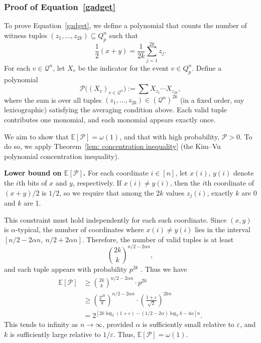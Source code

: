 \documentclass[11pt]{article}
\theoremstyle{definition}
\theoremstyle{plain}
\begin{document}
\subsubsection*{Proof of Equation~\eqref{gadget}}

To prove Equation~\eqref{gadget}, we define a polynomial that counts the number of witness tuples \( (z_1, \ldots, z_{2k}) \subseteq Q_p^n \) such that
\[
\frac{1}{2}(x + y) = \frac{1}{2k} \sum_{j=1}^{2k} z_j.
\]
For each \( v \in \mathcal{Q}^n \), let \( X_v \) be the indicator for the event \( v \in Q_p^n \). Define a polynomial
\[
\mathcal{P}\big((X_v)_{v \in \mathcal{Q}^n}\big) := \sum X_{z_1} \cdots X_{z_{2k}},
\]
where the sum is over all tuples \( (z_1, \ldots, z_{2k}) \in (\mathcal{Q}^n)^{2k} \) (in a fixed order, say lexicographic) satisfying the averaging condition above. Each valid tuple contributes one monomial, and each monomial appears exactly once.

We aim to show that \( \mathbb{E}[\mathcal{P}] = \omega(1) \), and that with high probability, \( \mathcal{P}>0 \). To do so, we apply Theorem~\ref{lem: concentration inequality} (the Kim–Vu polynomial concentration inequality).

\vspace{.1 in}


{\bf Lower bound on \( \mathbb{E}[\mathcal{P}] \).}
For each coordinate \( i \in [n] \), let \( x(i) \), \( y(i) \) denote the \( i \)th bits of \( x \) and \( y \), respectively. If \( x(i) \neq y(i) \), then the \( i \)th coordinate of \( (x + y)/2 \) is \( 1/2 \), so we require that among the \( 2k \) values \( z_j(i) \), exactly \( k \) are 0 and \( k \) are 1.

This constraint must hold independently for each such coordinate. Since \( (x, y) \) is \( \alpha \)-typical, the number of coordinates where \( x(i) \neq y(i) \) lies in the interval \( \left[ n/2 - 2\alpha n,\ n/2 + 2\alpha n \right] \). Therefore, the number of valid tuples is at least
\[
\binom{2k}{k}^{n/2 - 2\alpha n},
\]
and each tuple appears with probability \( p^{2k} \) . Thus we have
\begin{align*}
\mathbb{E}[\mathcal{P}] 
&\geq  \binom{2k}{k}^{n/2 - 2\alpha n} \cdot p^{2k} \\
&\geq   \left( \frac{2^{2k}}{k} \right)^{n/2 - 2\alpha n} \cdot \left( \frac{1 + \varepsilon}{\sqrt{2}} \right)^{2kn} \\
&=   2^{[2k\log_2(1 + \varepsilon) - (1/2 - 2\alpha)\log_2 k - 4\alpha]n}.
\end{align*}
This tends to infinity as \( n \to \infty \), provided \( \alpha \) is sufficiently small relative to \( \varepsilon \), and \( k \) is sufficiently large relative to \( 1/\varepsilon \). Thus, \( \mathbb{E}[\mathcal{P}] = \omega(1) \).
\end{document}

